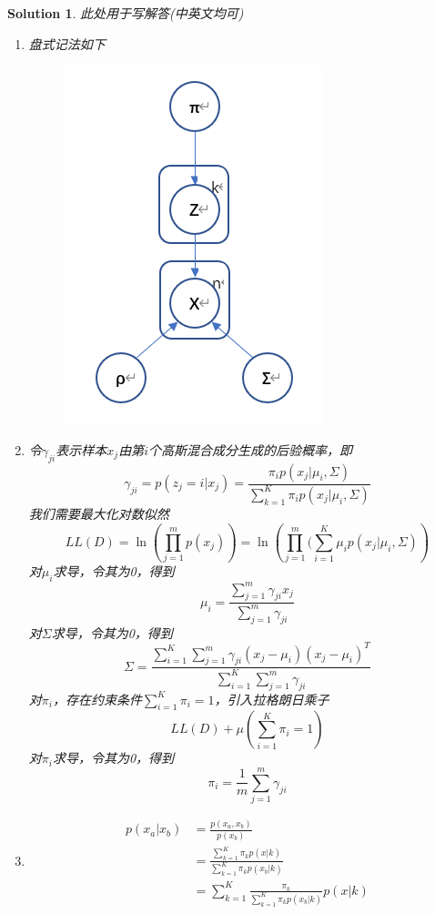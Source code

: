 \documentclass[a4paper,UTF8]{article}
\newtheorem*{solution}{Solution}
\numberwithin{equation}{section}
\begin{document}
\begin{solution}
此处用于写解答(中英文均可)
\begin{enumerate}
	\item 
	盘式记法如下
	\begin{figure}[H]
		\centering
		\includegraphics[scale=0.5]{plate.png}
	\end{figure}
	\item 
	令$\gamma_{ji}$表示样本$x_j$由第$i$个高斯混合成分生成的后验概率，即
	\[\gamma_{ji}=p(z_j=i|x_j)=\frac{\pi_i p(x_j|\mu_i,\Sigma)}{\sum_{k=1}^K \pi_i p(x_j|\mu_i,\Sigma)}\]
	我们需要最大化对数似然
	\[LL(D)=\ln\left(\prod_{j=1}^m p(x_j)\right)=\ln\left(\prod_{j=1}^m(\sum_{i=1}^K \mu_i p(x_j|\mu_i,\Sigma)\right)\]
	对$\mu_i$求导，令其为0，得到
	\[\mu_i=\frac{\sum_{j=1}^m \gamma_{ji}x_j}{\sum_{j=1}^m \gamma_{ji}}\]
	对$\Sigma$求导，令其为0，得到
	\[\Sigma=\frac{\sum_{i=1}^K\sum_{j=1}^m \gamma_{ji}(x_j-\mu_i)(x_j-\mu_i)^T}{\sum_{i=1}^K\sum_{j=1}^m \gamma_{ji}}\]
	对$\pi_i$，存在约束条件$\sum_{i=1}^K\pi_i=1$，引入拉格朗日乘子
	\[LL(D)+\mu\left(\sum_{i=1}^K\pi_i=1 \right)\]
	对$\pi_i$求导，令其为0，得到
	\[\pi_i=\frac{1}{m}\sum_{j=1}^m\gamma_{ji}\]
	\item 
	\begin{align*}
		p(x_a|x_b)&=\frac{p(x_a,x_b)}{p(x_b)}\\
				&=\frac{\sum_{k=1}^K\pi_k p(x|k)}{\sum_{k=1}^K\pi_k p(x_b|k)}\\
				&=\sum_{k=1}^K\frac{\pi_k}{\sum_{k=1}^K\pi_k p(x_b|k)}p(x|k)
	\end{align*}
\end{enumerate}
\end{solution}
\end{document}
